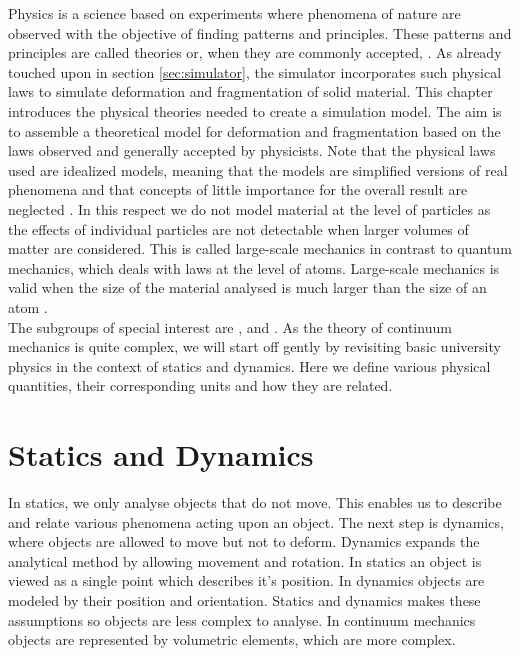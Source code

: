 
Physics is a science based on experiments where phenomena of nature
are observed with the objective of finding patterns and
principles. These patterns and principles are called theories or, when
they are commonly accepted, 
.
%
As already touched upon in section \vref{sec:simulator}, the
simulator incorporates such physical laws to simulate
deformation and fragmentation of solid material. This
chapter introduces the physical theories needed to create a
 simulation model.
%
The aim is to assemble a theoretical model for deformation and
fragmentation based on the laws observed and generally accepted by
physicists.
%
Note that the physical laws used are idealized models, meaning
that the models are simplified versions of real phenomena and that
concepts of little importance for the overall result are neglected
.
%
In this respect we do not model material at the level of particles
as the effects of individual particles are not detectable when
larger volumes of matter are considered. This is called large-scale
mechanics in contrast to quantum mechanics, which deals with laws at
the level of atoms. Large-scale mechanics is valid when the size of
the material analysed is much larger than the size of an atom
. \\

The subgroups of special interest are ,
 and .
%
As the theory of continuum mechanics is quite complex, we will start
off gently by revisiting basic university physics in the context of
statics and dynamics. Here we define various physical quantities,
their corresponding units and how they are related.


\section{Statics and Dynamics}
In statics, we only analyse objects that do not move. This enables
us to describe and relate various phenomena acting upon an object.
%
The next step is dynamics, where objects are allowed to move
but not to deform. Dynamics expands the analytical
method by allowing movement and rotation.
%
In statics an object is viewed as a single point which describes it's
position. In dynamics objects are modeled by their position and
orientation. Statics and dynamics makes these assumptions so objects
are less complex to analyse. In continuum mechanics objects are
represented by volumetric elements, which are more complex.


